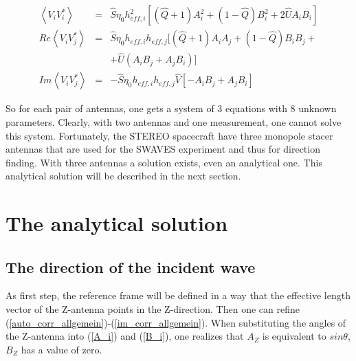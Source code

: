 \documentclass[a4paper,14pt]{extbook}
\begin{document}
\begin{eqnarray}
\left\langle V_i V_i^{*} \right\rangle &=& \hat{S}\eta_0 h_{eff,i}^2[(\hat{Q}+1) A^2_i + (1-\hat{Q}) B^2_i+ 2 \hat{U}A_i B_i]  \label{auto_corr_allgemein}\\
Re \left\langle V_i V_j^{*}\right\rangle &=& \hat{S}\eta_0 h_{eff,i} h_{eff,j}[(\hat{Q}+1) A_i A_j + (1-\hat{Q}) B_i B_j + \label{re_corr_allgemein}\\
& & + \hat{U} (A_i B_j + A_j B_i)] \nonumber \\
Im \left\langle V_i V_j^{*}\right\rangle &=& -\hat{S}\eta_0 h_{eff,i} h_{eff,j} \hat{V}[-A_i B_j + A_j B_i ] \label{im_corr_allgemein}
\end{eqnarray}

So for each pair of antennas, one gets a system of 3 equations with 8 unknown parameters. Clearly, with two antennas and one measurement, one cannot solve this system. Fortunately, the STEREO spacecraft have three monopole stacer antennas that are used for the SWAVES experiment and thus for direction finding. With three antennas a solution exists, even an analytical one. This analytical solution will be described in the next section.

\section{The analytical solution}
\subsection{The direction of the incident wave}

As first step, the reference frame will be defined in a way that the effective length vector of the Z-antenna points in the Z-direction. Then one can refine (\ref{auto_corr_allgemein})-(\ref{im_corr_allgemein}).  When substituting the angles of the Z-antenna into (\ref{A_i}) and (\ref{B_i}), one realizes that $A_Z$ is equivalent to $sin \theta$, $B_Z$ has a value of zero.
\end{document}
